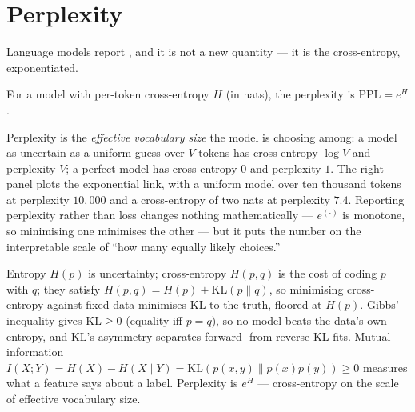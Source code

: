 \documentclass[11pt]{article}
\begin{document}
\section{Perplexity}

Language models report , and it is not a new quantity --- it
is the cross-entropy, exponentiated.

\begin{definition}[Perplexity]
For a model with per-token cross-entropy $H$ (in nats), the perplexity is
$\mathrm{PPL} = e^{H}$.
\end{definition}

Perplexity is the \emph{effective vocabulary size} the model is choosing among:
a model as uncertain as a uniform guess over $V$ tokens has cross-entropy
$\log V$ and perplexity $V$; a perfect model has cross-entropy $0$ and perplexity
$1$. The right panel plots the exponential link, with a uniform model over ten
thousand tokens at perplexity $10{,}000$ and a cross-entropy of two nats at
perplexity $7.4$. Reporting perplexity rather than loss changes nothing
mathematically --- $e^{(\cdot)}$ is monotone, so minimising one minimises the
other --- but it puts the number on the interpretable scale of ``how many equally
likely choices.''

\begin{summarybox}
Entropy $H(p)$ is uncertainty; cross-entropy $H(p,q)$ is the cost of coding $p$
with $q$; they satisfy $H(p,q)=H(p)+\mathrm{KL}(p\|q)$, so minimising
cross-entropy against fixed data minimises $\mathrm{KL}$ to the truth, floored at
$H(p)$. Gibbs' inequality gives $\mathrm{KL}\ge 0$ (equality iff $p=q$), so no
model beats the data's own entropy, and KL's asymmetry separates forward- from
reverse-KL fits. Mutual information $I(X;Y)=H(X)-H(X\mid Y)=
\mathrm{KL}(p(x,y)\|p(x)p(y))\ge 0$ measures what a feature says about a label.
Perplexity is $e^{H}$ --- cross-entropy on the scale of effective vocabulary
size.
\end{summarybox}
\end{document}
